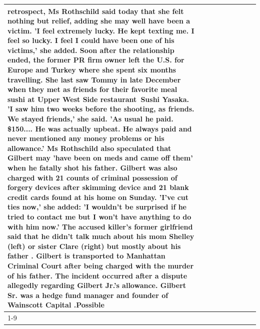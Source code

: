 \begin{table}[H]
\begin{tabular}{lllrlllll}
retrospect, Ms Rothschild said today that she felt nothing but relief, adding she may well have been a victim. 'I feel extremely lucky. He kept texting me. I feel so lucky. I feel I could have been one of his victims,' she added. Soon after the relationship ended, the former PR firm owner left the U.S. for Europe and Turkey where she spent six months  travelling. She last saw Tommy in late December when they met as friends for their favorite meal sushi at Upper West Side restaurant Sushi Yasaka. 'I saw him two weeks before the shooting, as friends. We stayed friends,' she said. 'As usual he paid. \$150.... He was actually upbeat. He always paid and never mentioned any money problems or his allowance.' Ms Rothschild also speculated that Gilbert may 'have been on meds and came off them' when he fatally shot his father. Gilbert was also charged with 21 counts of criminal possession of forgery devices after skimming device and 21 blank credit cards found at his home on Sunday. 'I've cut ties now,' she added: 'I wouldn’t be surprised if he tried to contact me but I won’t have anything to do with him now.' The accused killer's former girlfriend said that he didn't talk much about his mom Shelley (left) or sister Clare (right) but mostly about his father . Gilbert is transported to Manhattan Criminal Court  after being charged with the murder of his father. The incident occurred after a dispute allegedly regarding Gilbert Jr.'s allowance. Gilbert Sr. was a hedge fund manager and founder of Wainscott Capital .Possible \\
\cline{1-9} \cline{2-9}

\end{tabular}
\end{table}
